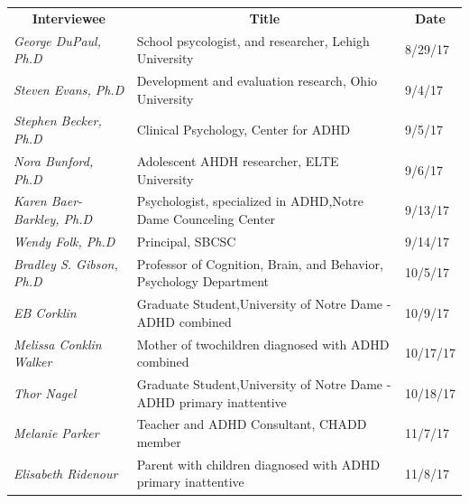 \documentclass[letterpaper,10pt]{article}
\begin{document}
\begin{appendices}
\begin{table}[]
\centering
\begin{tabular}{lll}
\multicolumn{1}{c}{\textbf{Interviewee}} & \multicolumn{1}{c}{\textbf{Title}}                                     & \multicolumn{1}{c}{\textbf{Date}} \\
\textit{George DuPaul, Ph.D}             & School psycologist, and researcher, Lehigh University                  & 8/29/17                           \\
\textit{Steven Evans, Ph.D}              & Development and evaluation research, Ohio University                   & 9/4/17                            \\
\textit{Stephen Becker, Ph.D}            & Clinical Psychology, Center for ADHD                                   & 9/5/17                            \\
\textit{Nora Bunford, Ph.D}              & Adolescent AHDH researcher, ELTE University                            & 9/6/17                            \\
\textit{Karen Baer-Barkley, Ph.D}        & Psychologist, specialized in ADHD,Notre Dame Counceling Center         & 9/13/17                           \\
\textit{Wendy Folk, Ph.D}                & Principal, SBCSC                                                       & 9/14/17                           \\
\textit{Bradley S. Gibson, Ph.D}         & Professor of Cognition, Brain, and Behavior, Psychology Department     & 10/5/17                           \\
\textit{EB Corklin}                      & Graduate Student,University of Notre Dame -ADHD combined               & 10/9/17                           \\
\textit{Melissa Conklin Walker}          & Mother of  twochildren diagnosed with ADHD combined                    & 10/17/17                          \\
\textit{Thor Nagel}                      & Graduate Student,University of Notre Dame -ADHD primary inattentive    & 10/18/17                          \\
\textit{Melanie Parker}                  & Teacher and ADHD Consultant, CHADD member                                            & 11/7/17                           \\
\textit{Elisabeth Ridenour}              & Parent with children diagnosed with ADHD primary inattentive           & 11/8/17                           \\

\end{tabular}
\end{table}
\end{appendices}
\end{document}
